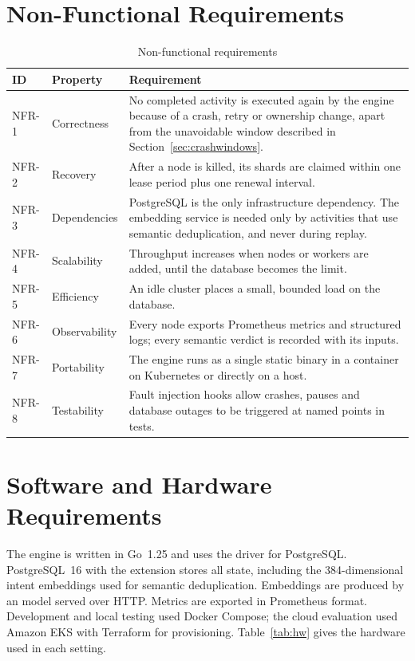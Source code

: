 \section{Non-Functional Requirements}

\begin{table}[htbp]
  \centering
  \caption{Non-functional requirements}
  \label{tab:nfr}
  \small
  \begin{tabular}{|p{0.52in}|p{1.09in}|p{3.59in}|}
    \hline
    \textbf{ID} & \textbf{Property} & \textbf{Requirement} \\
    \hline
    NFR-1 & Correctness & No completed activity is executed again by the
      engine because of a crash, retry or ownership change, apart from the
      unavoidable window described in Section~\ref{sec:crashwindows}. \\
    \hline
    NFR-2 & Recovery & After a node is killed, its shards are claimed within
      one lease period plus one renewal interval. \\
    \hline
    NFR-3 & Dependencies & PostgreSQL is the only infrastructure dependency.
      The embedding service is needed only by activities that use semantic
      deduplication, and never during replay. \\
    \hline
    NFR-4 & Scalability & Throughput increases when nodes or workers are
      added, until the database becomes the limit. \\
    \hline
    NFR-5 & Efficiency & An idle cluster places a small, bounded load on the
      database. \\
    \hline
    NFR-6 & Observability & Every node exports Prometheus metrics and
      structured logs; every semantic verdict is recorded with its inputs. \\
    \hline
    NFR-7 & Portability & The engine runs as a single static binary in a
      container on Kubernetes or directly on a host. \\
    \hline
    NFR-8 & Testability & Fault injection hooks allow crashes, pauses and
      database outages to be triggered at named points in tests. \\
    \hline
  \end{tabular}
\end{table}

\section{Software and Hardware Requirements}

The engine is written in Go~1.25 and uses the  driver for
PostgreSQL. PostgreSQL~16 with the  extension stores all state,
including the 384-dimensional intent embeddings used for semantic
deduplication. Embeddings are produced by an  model
served over HTTP. Metrics are exported in Prometheus format. Development and
local testing used Docker Compose; the cloud evaluation used Amazon EKS with
Terraform for provisioning. Table~\ref{tab:hw} gives the hardware used in
each setting.

